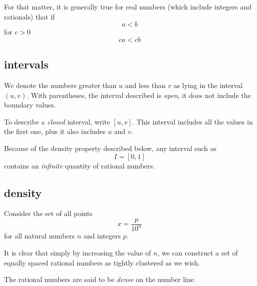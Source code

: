 \documentclass[11pt, oneside]{article}
\begin{document}
For that matter, it is generally true for real numbers (which include integers and rationals) that if
\[ a < b \]
for $c > 0$
\[ ca < cb \]

\subsection*{intervals}
We denote the numbers greater than $u$ and less than $v$ as lying in the interval $(u,v)$.  With parentheses, the interval described is \emph{open}, it does not include the boundary values.

To describe a \emph{closed} interval, write $[u,v]$.  This interval includes all the values in the first one, plus it also includes $u$ and $v$.

Because of the density property described below, any interval such as
\[ I = [0,1] \]
contains an \emph{infinite} quantity of rational numbers.

\subsection*{density}
Consider the set of all points
\[ x = \frac{p}{10^n} \]
for all natural numbers $n$ and integers $p$.

It is clear that simply by increasing the value of $n$, we can construct a set of equally spaced rational numbers as tightly clustered as we wish.

The rational numbers are said to be \emph{dense} on the number line.  
\end{document}
